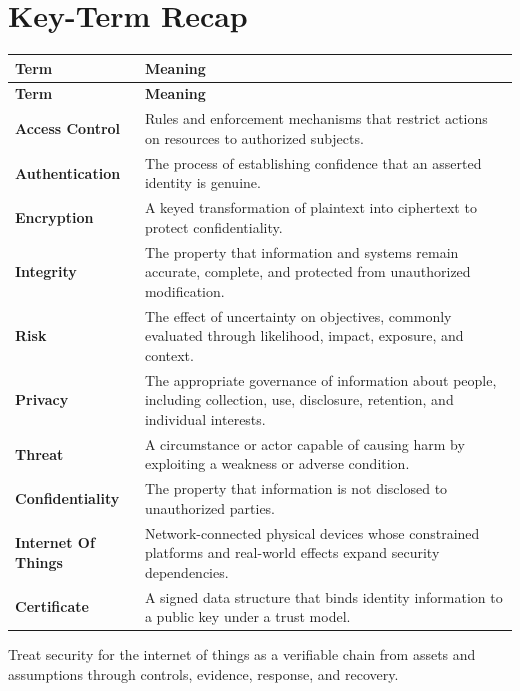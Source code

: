\documentclass[11pt]{article}
\begin{document}
\section*{Key-Term Recap}
\begin{longtable}{>{\RaggedRight\arraybackslash}p{}>{\RaggedRight\arraybackslash}p{}}
\toprule\rowcolor{Navy}\color{white}\textbf{Term} & \color{white}\textbf{Meaning}\\\midrule
\endfirsthead
\toprule\rowcolor{Navy}\color{white}\textbf{Term} & \color{white}\textbf{Meaning}\\\midrule
\endhead
\textbf{Access Control} & Rules and enforcement mechanisms that restrict actions on resources to authorized subjects. \\\midrule
\textbf{Authentication} & The process of establishing confidence that an asserted identity is genuine. \\\midrule
\textbf{Encryption} & A keyed transformation of plaintext into ciphertext to protect confidentiality. \\\midrule
\textbf{Integrity} & The property that information and systems remain accurate, complete, and protected from unauthorized modification. \\\midrule
\textbf{Risk} & The effect of uncertainty on objectives, commonly evaluated through likelihood, impact, exposure, and context. \\\midrule
\textbf{Privacy} & The appropriate governance of information about people, including collection, use, disclosure, retention, and individual interests. \\\midrule
\textbf{Threat} & A circumstance or actor capable of causing harm by exploiting a weakness or adverse condition. \\\midrule
\textbf{Confidentiality} & The property that information is not disclosed to unauthorized parties. \\\midrule
\textbf{Internet Of Things} & Network-connected physical devices whose constrained platforms and real-world effects expand security dependencies. \\\midrule
\textbf{Certificate} & A signed data structure that binds identity information to a public key under a trust model. \\\midrule
\bottomrule
\end{longtable}
\begin{takeawaybox}
Treat security for the internet of things as a verifiable chain from assets and assumptions through controls, evidence, response, and recovery.
\end{takeawaybox}
\end{document}
